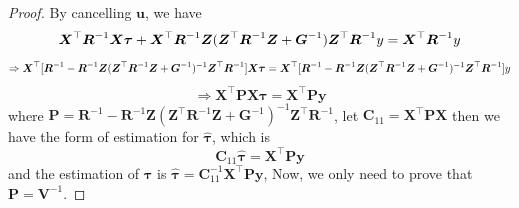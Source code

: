 \documentclass[
  a4paper,
  oneside,
  openany,
  12pt,
  onecolumn]{book}
\theoremstyle{definition}
\theoremstyle{definition}
\theoremstyle{plain}
\theoremstyle{remark}
\begin{document}
\begin{proof}
By cancelling \(\boldsymbol{u}\), we have \[
\boldsymbol{X}^\top\boldsymbol{R}^{-1}\boldsymbol{X}\boldsymbol{\tau}+\boldsymbol{X}^\top\boldsymbol{R}^{-1}\boldsymbol{Z}(\boldsymbol{Z}^\top\boldsymbol{R}^{-1}\boldsymbol{Z}+\boldsymbol{G}^{-1})\boldsymbol{Z}^\top\boldsymbol{R}^{-1}y=\boldsymbol{X}^\top\boldsymbol{R}^{-1}y\\
\] \[
\Rightarrow \boldsymbol{X}^\top[\boldsymbol{R}^{-1}-\boldsymbol{R}^{-1}\boldsymbol{Z}(\boldsymbol{Z}^\top\boldsymbol{R}^{-1}\boldsymbol{Z}+\boldsymbol{G}^{-1})^{-1}\boldsymbol{Z}^\top\boldsymbol{R}^{-1}]\boldsymbol{X}\boldsymbol{\tau}=\boldsymbol{X}^\top[\boldsymbol{R}^{-1}-\boldsymbol{R}^{-1}\boldsymbol{Z}(\boldsymbol{Z}^\top\boldsymbol{R}^{-1}\boldsymbol{Z}+\boldsymbol{G}^{-1})^{-1}\boldsymbol{Z}^\top\boldsymbol{R}^{-1}]y\\
\] \[
\Rightarrow \boldsymbol{X}^\top\boldsymbol{P}\boldsymbol{X}\boldsymbol{\tau}=\boldsymbol{X}^\top\boldsymbol{P}\boldsymbol{y}
\] where
\(\boldsymbol{P}=\boldsymbol{R}^{-1}-\boldsymbol{R}^{-1}\boldsymbol{Z}(\boldsymbol{Z}^\top\boldsymbol{R}^{-1}\boldsymbol{Z}+\boldsymbol{G}^{-1})^{-1}\boldsymbol{Z}^\top\boldsymbol{R}^{-1}\),
let
\(\boldsymbol{C}_{11}=\boldsymbol{X}^\top\boldsymbol{P}\boldsymbol{X}\)
then we have the form of estimation for \(\hat{\boldsymbol{\tau}}\),
which is \[
\boldsymbol{C}_{11}\hat{\boldsymbol{\tau}}=\boldsymbol{X}^\top\boldsymbol{P}\boldsymbol{y}
\] and the estimation of \(\boldsymbol{\tau}\) is
\(\hat{\boldsymbol{\tau}}=\boldsymbol{C}_{11}^{-1}\boldsymbol{X}^\top\boldsymbol{P}\boldsymbol{y}\),
Now, we only need to prove that \(\boldsymbol{P}=\boldsymbol{V}^{-1}\).


\end{proof}
\end{document}
